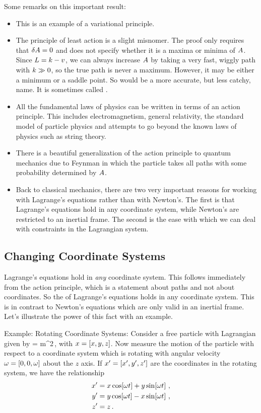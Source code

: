 Some remarks on this important result:
\begin{itemize}
\item This is an example of a variational principle.
%
\item The principle of least action is a slight misnomer. The proof only requires that $\delta A = 0$ and does not specify whether it is a maxima or minima of $A$. Since $L = k - v$, we can always increase $A$ by taking a very fast, wiggly path with $k\gg 0$, so the true path is never a maximum. However, it may be either a minimum or a saddle point. So  would be a more accurate, but less catchy, name. It is sometimes called .
%
\item All the fundamental laws of physics can be written in terms of an action principle. This includes electromagnetism, general relativity, the standard model of particle physics and attempts to go beyond the known laws of physics such as string theory.
%
\item There is a beautiful generalization of the action principle to quantum mechanics due to Feynman in which the particle takes all paths with some probability determined by $A$.
%
\item Back to classical mechanics, there are two very important reasons for working with Lagrange's equations rather than with Newton's. The first is that Lagrange's equations hold in any coordinate system, while Newton's are restricted to an inertial frame. The second is the ease with which we can deal with constraints in the Lagrangian system.
\end{itemize}


\subsection{Changing Coordinate Systems}
Lagrange's equations hold in \emph{any} coordinate system. This follows immediately from the action principle, which is a statement about paths and not about coordinates. So the  of Lagrange's equations holds in any coordinate system. This is in contrast to Newton's equations which are only valid in an inertial frame. Let's illustrate the power of this fact with an example.

Example: Rotating Coordinate Systems: Consider a free particle with Lagrangian given by
\beq
\lag = m\dt\pvec^2\,,
\eeq
with $x = \left[{x,y,z}\right]$. Now measure the motion of the particle with respect to a coordinate system which is rotating with angular velocity $\omega = \left[{0,0,\omega}\right]$ about the $z$ axis. If $x' = \left[{x',y',z'}\right]$ are the coordinates in the rotating system, we have the relationship
\begin{align*}
x' &= x\cos\!\left[{\omega t}\right] + y\sin\!\left[{\omega t}\right]\,,\\
y' &= y\cos\!\left[{\omega t}\right] - x\sin\!\left[{\omega t}\right]\,,\\
z' &= z\,.
\end{align*}

